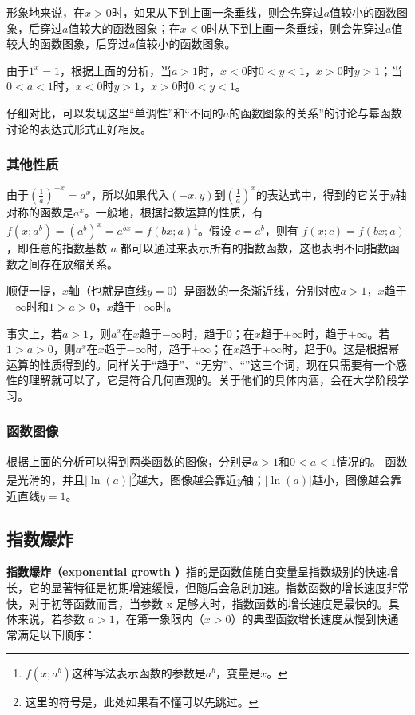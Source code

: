 形象地来说，在$x>0$时，如果从下到上画一条垂线，则会先穿过$a$值较小的函数图象，后穿过$a$值较大的函数图象；在$x<0$时从下到上画一条垂线，则会先穿过$a$值较大的函数图象，后穿过$a$值较小的函数图象。

由于$1^x=1$，根据上面的分析，当$a>1$时，$x<0$时$0<y<1$，$x>0$时$y>1$；当$0<a<1$时，$x<0$时$y>1$，$x>0$时$0<y<1$。

仔细对比，可以发现这里“单调性”和“不同的$a$的函数图象的关系”的讨论与幂函数讨论的表达式形式正好相反。

\subsubsection{其他性质}

由于$\displaystyle \left(\frac{1}{a}\right)^{-x}=a^{x}$，所以如果代入$(-x,y)$到$\displaystyle\left(\frac{1}{a}\right)^{x}$的表达式中，得到的它关于$y$轴对称的函数是$a^{x}$。一般地，根据指数运算的性质，有$f(x;a^b)=\left(a^b\right)^x=a^{bx}=f(bx;a)$\footnote{$f(x;a^b)$这种写法表示函数的参数是$a^b$，变量是$x$。}。假设 $c = a^b$，则有 $f(x; c) = f(bx; a)$，即任意的指数基数 $a$ 都可以通过来表示所有的指数函数，这也表明不同指数函数之间存在放缩关系。

顺便一提，$x$轴（也就是直线$y=0$）是函数的一条渐近线，分别对应$a>1$，$x$趋于$-\infty$时和$1>a>0$，$x$趋于$+\infty$时。

事实上，若$a>1$，则$a^x$在$x$趋于$-\infty$时，趋于$0$；在$x$趋于$+\infty$时，趋于$+\infty$。若$1>a>0$，则$a^x$在$x$趋于$-\infty$时，趋于$+\infty$；在$x$趋于$+\infty$时，趋于$0$。这是根据幂运算的性质得到的。同样关于“趋于”、“无穷”、“”这三个词，现在只需要有一个感性的理解就可以了，它是符合几何直观的。关于他们的具体内涵，会在大学阶段学习。

\subsubsection{函数图像}

根据上面的分析可以得到两类函数的图像，分别是$a>1$和$0<a<1$情况的。
函数是光滑的，并且$|\ln(a)|$\footnote{这里的符号是，此处如果看不懂可以先跳过。}越大，图像越会靠近$y$轴；$|\ln(a)|$越小，图像越会靠近直线$y=1$。


\subsection{指数爆炸}

\textbf{指数爆炸（exponential growth ）}指的是函数值随自变量呈指数级别的快速增长，它的显著特征是初期增速缓慢，但随后会急剧加速。指数函数的增长速度非常快，对于初等函数而言，当参数 x 足够大时，指数函数的增长速度是最快的。具体来说，若参数 $a > 1$，在第一象限内（$x > 0$）的典型函数增长速度从慢到快通常满足以下顺序：

